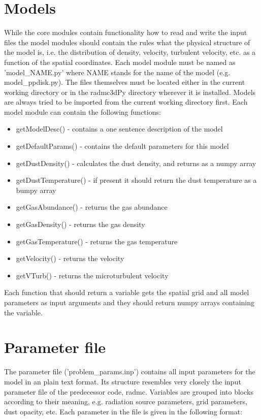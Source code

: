 \documentclass[12pt]{article}
\begin{document}
\section{Models}
\label{sec:model}

While the core modules contain functionality how to read and write the input files the model modules
should contain the rules what the physical structure of the model is, i.e. the distribution of density, velocity, 
turbulent velocity, etc. as a function of the spatial coordinates. Each model module must be named as
'model\_NAME.py' where NAME stands for the name of the model (e.g. model\_ppdisk.py). The files
themselves must be located either in the current working directory or in the radmc3dPy directory wherever
it is installed. Models are always tried to be imported from the current working directory first. 
Each model module can contain the following functions:
\begin{itemize}
\item[] getModelDesc() - contains a one sentence description of the model
\item[] getDefaultParams() - contains the default parameters for this model
\item[] getDustDensity() - calculates the dust density, and returns as a numpy array
\item[] getDustTemperature() - if present it should return the dust temperature as a bumpy array 
\item[] getGasAbundance() - returns the gas abundance 
\item[] getGasDensity() - returns the gas density
\item[] getGasTemperature() - returns the gas temperature
\item[] getVelocity() - returns the velocity 
\item[] getVTurb() - returns the microturbulent velocity
\end{itemize}
Each function that should return a variable gets the spatial grid and all model parameters as input  arguments
and they should return numpy arrays containing the variable. 

\section{Parameter file}
\label{sec:parfile}
The parameter file ('problem\_params.inp') contains all input parameters for the model in an plain text format. Its structure 
resembles very closely the input parameter file of the predecessor code, radmc. Variables are grouped into blocks according to their
meaning, e.g. radiation source parameters, grid parameters, dust opacity, etc. Each parameter in the file is given in the following
format: 
\end{document}
